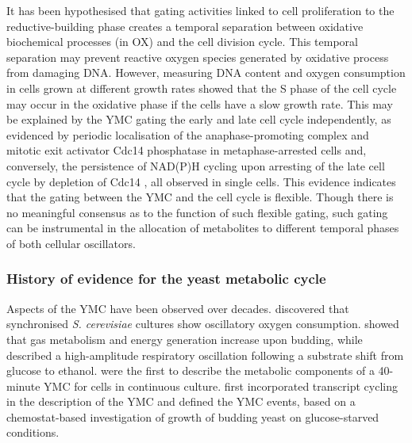 It has been hypothesised that gating activities linked to cell proliferation to the reductive-building phase
creates a temporal separation between oxidative biochemical processes (in OX) and the cell division cycle.
This temporal separation may prevent reactive oxygen species generated by oxidative process from damaging DNA.
However, measuring DNA content and oxygen consumption in cells grown at different growth rates \parencite{slavovCouplingGrowthRate2011} showed that the S phase of the cell cycle may occur in the oxidative phase if the cells have a slow growth rate.
This may be explained by the YMC gating the early and late cell cycle independently, as evidenced by periodic localisation of the anaphase-promoting complex and mitotic exit activator Cdc14 phosphatase in metaphase-arrested cells \parencite{luPeriodicCyclinCdkActivity2010} and, conversely, the persistence of NAD(P)H cycling upon arresting of the late cell cycle by depletion of Cdc14 \parencite{papagiannakisAutonomousMetabolicOscillations2017}, all observed in single cells.
This evidence indicates that the gating between the YMC and the cell cycle is flexible.
Though there is no meaningful consensus as to the function of such flexible gating,
such gating can be instrumental in the allocation of metabolites to different temporal phases of both cellular oscillators.

\subsubsection{History of evidence for the yeast metabolic cycle}
\label{subsubsec:intro-ymc-definition-history}


Aspects of the YMC have been observed over decades.
\textcite{nosohSYNCHRONIZATIONBUDDINGCYCLE1962} discovered that synchronised \emph{S. cerevisiae} cultures show oscillatory oxygen consumption.
\textcite{kasparvonmeyenburgEnergeticsBuddingCycle1969} showed that gas metabolism and energy generation increase upon budding, while \textcite{mochanRespiratoryOscillationsAdapting1973} described a high-amplitude respiratory oscillation following a substrate shift from glucose to ethanol.
\textcite{satroutdinovOscillatoryMetabolismSaccharomyces1992} were the first to describe the metabolic components of a 40-minute YMC for cells in continuous culture.
\textcite{tuLogicYeastMetabolic2005}
first incorporated transcript cycling in the description of the YMC and defined the YMC events,
based on a chemostat-based investigation of growth of budding yeast on glucose-starved conditions.

